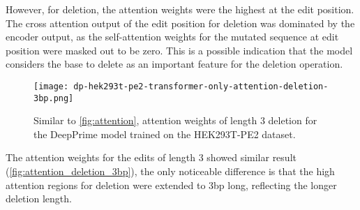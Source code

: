 However, for deletion, the attention weights were the highest at the edit position. The cross attention output of the edit position for deletion was dominated by the encoder output, as the self-attention weights for the mutated sequence at edit position were masked out to be zero. This is a possible indication that the model considers the base to delete as an important feature for the deletion operation.

\begin{figure}
    \centering
    \texttt{[image: dp-hek293t-pe2-transformer-only-attention-deletion-3bp.png]}
    \caption[Attention weights for 3-bp deletion of the DeepPrime model trained on the HEK293T-PE2 dataset]{Similar to \autoref{fig:attention}, attention weights of length 3 deletion for the DeepPrime model trained on the HEK293T-PE2 dataset.}
    \label{fig:attention_deletion_3bp}
\end{figure}

The attention weights for the edits of length 3 showed similar result (\autoref{fig:attention_deletion_3bp}), the only noticeable difference is that the high attention regions for deletion were extended to 3bp long, reflecting the longer deletion length.